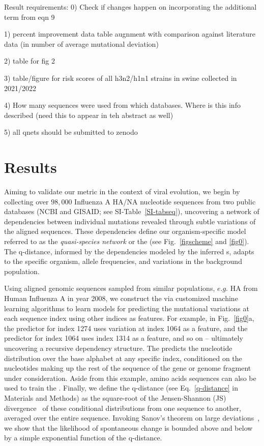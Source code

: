\documentclass[onecolumn, compsoc,10pt]{IEEEtran}
\begin{document}
  {\color{magenta}
    Result requirements:
    0) Check if changes happen on incorporating the additional term from eqn 9
    
    1) percent improvement data table augnment with comparison against literature data (in number of average mutational deviation)
    
    2) table for fig 2
    
    3) table/figure for risk scores of all h3n2/h1n1 strains in swine collected in 2021/2022
    
    4) How many sequences were used from which databases. Where is this info described (need this to appear in teh abstract as well)
    
    5) all qnets should be submitted to zenodo
    }
 

\section*{Results}

Aiming to validate our metric in the context of  viral evolution, we begin by collecting over $98,000$ Influenza A HA/NA nucleotide sequences from two public databases (NCBI %
and GISAID; %
see SI-Table~\ref{SI-tabseq}), uncovering a network of  dependencies between individual mutations revealed through subtle variations of the aligned sequences. These dependencies define our organism-specific model referred to as the \textit{quasi-species network} or the \qnet (see Fig.~\ref{figscheme} and \ref{fig0}). The q-distance, informed by the dependencies modeled by the inferred {\qnet}s, adapts to the specific organism, allele frequencies, and variations in the background population. 

Using aligned genomic sequences sampled from  similar populations, $e.g.$ HA from Human Influenza A in year 2008, we construct the \qnet via  customized machine learning algorithms to  learn models for predicting the mutational variations at each sequence index using other indices  as features. For example, in Fig.~\ref{fig0}a,  the predictor for index 1274 uses variation at index 1064 as a feature, and the predictor for index 1064 uses index 1314 as a feature, and so on -- ultimately uncovering a recursive dependency structure. The \qnet predicts the nucleotide distribution over the base alphabet at any specific index, conditioned on the nucleotides making up the rest of the sequence of the gene or genome fragment under consideration. Aside from this example, amino acids sequences can also be used to train the \qnet. Finally, we define the q-distance (see Eq.~\eqref{q-distance} in Materials and Methods) as the square-root of the Jensen-Shannon (JS) divergence~\cite{cover} of these conditional distributions from one sequence to another, averaged over the entire sequence. Invoking Sanov's theorem on large deviations~\cite{cover}, we show  that the  likelihood of spontaneous change is bounded above and below by a simple exponential function of the  q-distance. 
\end{document}
